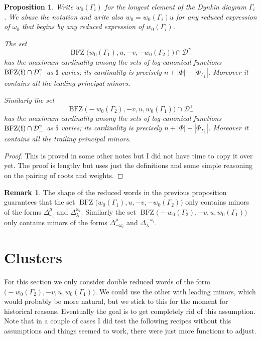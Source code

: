 \documentclass[a4paper]{amsart}
\newtheorem{proposition}[theorem]{Proposition}
\theoremstyle{definition}
\newtheorem{remark}[theorem]{Remark}
\begin{document}
\begin{proposition}
  Write $w_0(\Gamma_i)$ for the longest element of the Dynkin diagram $\Gamma_i$.
  We abuse the notation and write also $w_0=w_0(\Gamma_i)u$ for any reduced expression of $\omega_0$ that begins by any reduced expression of $w_0(\Gamma_i)$.

  The set
  \[
    \operatorname{BFZ}\big(w_0(\Gamma_1),u,-v,-w_0(\Gamma_2)\big)\cap\mathcal{D}^\gamma_+
  \]
  has the maximum cardinality among the sets of log-canonical functions $\operatorname{BFZ}(\bf{i})\cap\mathcal{D}^\gamma_+$ as $\bf{i}$ varies; its cardinality is precisely $n+|\Phi|-|\Phi_{\Gamma_1}|$. 
  Moreover it contains all the leading principal minors.

  Similarly the set
  \[
    \operatorname{BFZ}\big(-w_0(\Gamma_2),-v,u,w_0(\Gamma_1)\big)\cap\mathcal{D}^\gamma_-
  \]
  has the maximum cardinality among the sets of log-canonical functions $\operatorname{BFZ}(\bf{i})\cap\mathcal{D}^\gamma_-$ as $\bf{i}$ varies; its cardinality is precisely $n+|\Phi|-|\Phi_{\Gamma_1}|$. 
  Moreover it contains all the trailing principal minors.
\end{proposition}
\begin{proof}
  This is proved in some other notes but I did not have time to copy it over yet.
  The proof is lengthy but uses just the definitions and some simple reasoning on the pairing of roots and weights.
\end{proof}

\begin{remark}
  The shape of the reduced words in the previous proposition guarantees that the set $\operatorname{BFZ}\big(w_0(\Gamma_1),u,-v,-w_0(\Gamma_2)\big)$ only contains minors of the forms $\Delta_{\omega_i}^\mu$ and $\Delta_\lambda^{\omega_i}$.
  Similarly the set $\operatorname{BFZ}\big(-w_0(\Gamma_2),-v,u,w_0(\Gamma_1)\big)$ only contains minors of the forms $\Delta_{-\omega_i}^\mu$ and $\Delta_\lambda^{-\omega_i}$.
\end{remark}

\section{Clusters}
For this section we only consider double reduced words of the form $\big(-w_0(\Gamma_2),-v,u,w_0(\Gamma_1)\big)$.
We could use the other with leading minors, which would probably be more natural, but we stick to this for the moment for historical reasons.
Eventually the goal is to get completely rid of this assumption.
Note that in a couple of cases I did test the following recipes without this assumptions and things seemed to work, there were just more functions to adjust.
\end{document}
